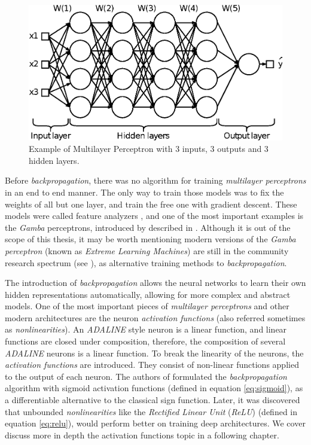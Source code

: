 \begin{figure}
	\centering
	\includegraphics[width=0.5\linewidth]{chapter2/images/mlp}
	\caption{Example of Multilayer Perceptron with 3 inputs, 3 outputs and 3 hidden layers.}
	\label{fig:mlp}
\end{figure}


Before \textit{backpropagation}, there was no algorithm for training \textit{multilayer perceptrons} in an end to end manner. The only way to train those models was to fix the weights of all but one layer, and train the free one with gradient descent. These models were called feature analyzers \cite{hinton1986}, and one of the most important examples is the \textit{Gamba} perceptrons, introduced by described in \cite{minsky69perceptrons}. Although it is out of the scope of this thesis, it may be worth mentioning modern versions of the \textit{Gamba perceptron} (known as \textit{Extreme Learning Machines}) are still in the community research spectrum (see \cite{Huang2006, Huang2012}), as alternative training methods to \textit{backpropagation}.

The introduction of \textit{backpropagation} allows the neural networks to learn their own hidden representations automatically, allowing for more complex and abstract models. One of the most important pieces of \textit{multilayer perceptrons} and other modern architectures are the neuron \textit{activation functions} (also referred sometimes as \textit{nonlinearities}). An \textit{ADALINE} style neuron is a linear function, and linear functions are closed under composition, therefore, the composition of several \textit{ADALINE} neurons is a linear function. To break the linearity of the neurons, the \textit{activation functions} are introduced. They consist of non-linear functions applied to the output of each neuron. The authors of \cite{hinton1986} formulated the \textit{backpropagation} algorithm with sigmoid activation functions (defined in equation \ref{eq:sigmoid}), as a differentiable alternative to the classical sign function. Later, it was discovered that unbounded \textit{nonlinearities} like the \textit{Rectified Linear Unit} (\textit{ReLU}) \cite{nair2010} (defined in equation \ref{eq:relu}), would perform better on training deep architectures. We cover discuss more in depth the activation functions topic in a following chapter. %


